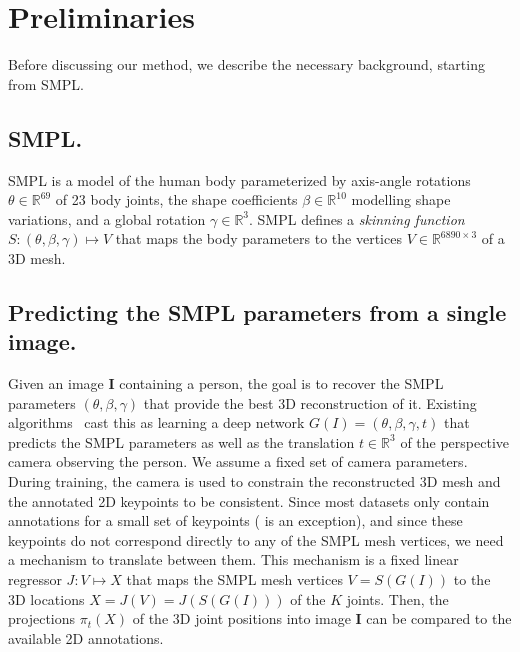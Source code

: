 \section{Preliminaries}\label{s:preliminaries}

Before discussing our method, we describe the necessary background, starting from SMPL\@.

\subsection{SMPL.}

SMPL is a model of the human body parameterized by axis-angle rotations $\theta \in \mathbb{R}^{69}$ of 23 body joints, the shape coefficients $\beta \in \mathbb{R}^{10}$ modelling shape variations, and a global rotation $\gamma \in \mathbb{R}^{3}$.
SMPL defines a \emph{skinning function}  $S: (\theta, \beta, \gamma) \mapsto V$ that maps the body parameters to the vertices $V \in \mathbb{R}^{6890\times 3}$ of a 3D mesh.

\subsection{Predicting the SMPL parameters from a single image.}

Given an image $\mathbf{I}$ containing a person, the goal is to recover the SMPL parameters $(\theta, \beta, \gamma)$ that provide the best 3D reconstruction of it.
Existing algorithms~\cite{kanazawa18learning} cast this as learning a deep network $G(I) = (\theta, \beta, \gamma, t)$ that predicts the SMPL parameters as well as the %
translation $t \in \mathbb{R}^3$ of the perspective camera observing the person. We assume a fixed set of camera parameters.
During training, the camera is used to constrain the reconstructed 3D mesh and the annotated 2D keypoints to be consistent.
Since most datasets only contain annotations for a small set of keypoints (\cite{guler2018densepose} is an exception), and since these keypoints do not correspond directly to any of the SMPL mesh vertices, we need a mechanism to translate between them.
This mechanism is a fixed linear regressor $J : V \mapsto X$ that maps the SMPL mesh vertices $V = S(G(I))$ to the 3D locations $X = J(V) = J(S(G(I)))$ of the $K$ joints.
Then, the projections $\pi_{t}(X)$ of the 3D joint positions into image $\mathbf{I}$ can be compared to the available 2D annotations.

